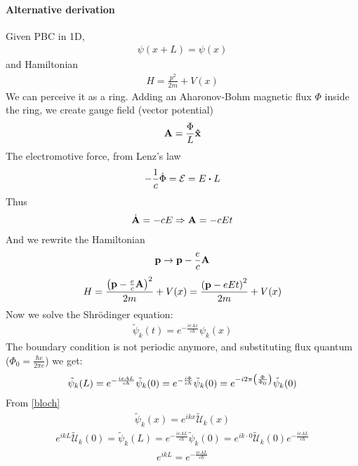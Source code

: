 \paragraph{Alternative derivation}
Given PBC in 1D, 
\begin{align}
\psi(x+L) = \psi(x)
\end{align}
and Hamiltonian
\begin{align}
H = \frac{p^2}{2m} + V(x)
\end{align}
We can perceive it as a ring. Adding an Aharonov-Bohm magnetic flux $\Phi$ inside the ring, we create gauge field  (vector potential)
\begin{align}
\vb{A} = \frac{\Phi}{L} \vu{x}
\end{align}
The electromotive force, from Lenz's law
\begin{align}
 -\frac{1}{c}\dot{\Phi}  = \mathcal{E} = E\vdot L
\end{align}
Thus
\begin{align}
\dot{\vb{A}} = - cE \Rightarrow \vb{A} = -cEt
\end{align}
And we rewrite the Hamiltonian
\begin{align}
\vb{p} \to \vb{p} -\frac{e}{c}\vb{A}
\end{align}
\begin{align}
H = \frac{\qty(\vb{p} -\frac{e}{c} \vb{A})^2}{2m} + V(x) = \frac{\qty(\vb{p} -eEt)^2}{2m} + V(x) 
\end{align}
Now we solve the Shr\"{o}dinger equation:
\begin{align}
\tilde{\psi}_k(t) = e^{-\frac{ieAx}{c\hbar}} \psi_k(x)
\end{align}
The boundary condition is not periodic anymore, and substituting flux quantum ($\Phi_0 = \frac{\hbar c}{2\pi e}$) we get:
\begin{align}
\tilde{\psi}_k(L) = e^{-\frac{ieAL}{c\hbar}} \tilde{\psi}_k(0)= e^{-\frac{i\Phi}{c\hbar}} \tilde{\psi}_k(0)= e^{-i 2\pi \qty(\frac{\Phi}{\Phi_0})} \tilde{\psi}_k(0)
\end{align}
From \cref{bloch} 
\begin{align}
\tilde{\psi}_k(x) = e^{ikx} \tilde{\mathcal{U}}_k(x)
\end{align}
\begin{align}
e^{ikL} \tilde{\mathcal{U}}_k(0) = \tilde{\psi}_k(L) =  e^{-\frac{ieAL}{c\hbar}} \tilde{\psi}_k(0) = e^{ik\cdot 0} \tilde{\mathcal{U}}_k(0)e^{-\frac{ieAL}{c\hbar}}
\end{align}
\begin{align}
e^{ikL} = e^{-\frac{ieAL}{c\hbar}}
\end{align}

